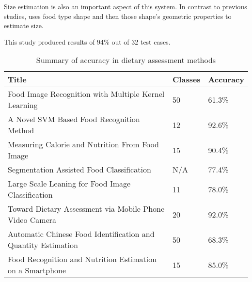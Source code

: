 Size estimation is also an important aspect of this system.
In contrast to previous studies, \parencite{snap} uses food type shape and then those shape's geometric properties to estimate size.

This study produced results of 94\% out of 32 test cases.


\begin{table}[]
\centering
\caption{Summary of accuracy in dietary assessment methods}
\label{other_dietary_summary}
\begin{tabular}{|l|l|l|}
\hline
\textbf{Title}                                                         & \textbf{Classes} & \textbf{Accuracy}   \\ \hline
Food Image Recognition with Multiple Kernel Learning          & 50             & 61.3\%    \\ \hline
A Novel SVM Based Food Recognition Method                     & 12             & 92.6\%     \\ \hline
Measuring Calorie and Nutrition From Food Image               & 15             & 90.4\%    \\ \hline
Segmentation Assisted Food Classification                     & N/A            & 77.4\%     \\ \hline
Large Scale Leaning for Food Image Classification             & 11             & 78.0\%       \\ \hline
Toward Dietary Assessment via Mobile Phone Video Camera       & 20             & 92.0\% \\ \hline
Automatic Chinese Food Identification and Quantity Estimation & 50             & 68.3\%     \\ \hline
Food Recognition and Nutrition Estimation on a Smartphone      & 15             & 85.0\% \\ \hline      
\end{tabular}
\end{table}